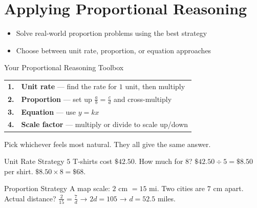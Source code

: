 \section{Applying Proportional Reasoning}

\begin{learningGoals}
\begin{itemize}
    \item Solve real-world proportion problems using the best strategy
    \item Choose between unit rate, proportion, or equation approaches
\end{itemize}
\end{learningGoals}

\begin{conceptBox}{Your Proportional Reasoning Toolbox}
\begin{center}
\begin{tabular}{c l}
    \textbf{1.} & \textbf{Unit rate} --- find the rate for $1$ unit, then multiply \\
    \textbf{2.} & \textbf{Proportion} --- set up $\frac{a}{b} = \frac{c}{d}$ and cross-multiply \\
    \textbf{3.} & \textbf{Equation} --- use $y = kx$ \\
    \textbf{4.} & \textbf{Scale factor} --- multiply or divide to scale up/down \\
\end{tabular}
\end{center}
Pick whichever feels most natural. They all give the same answer.
\end{conceptBox}

\begin{workedExample}{Unit Rate Strategy}
$5$ T-shirts cost $\$42.50$. How much for $8$?
\solutionLabel
$\$42.50 \div 5 = \$8.50$ per shirt. $\$8.50 \times 8 = \$68$.
\end{workedExample}

\begin{workedExample}{Proportion Strategy}
A map scale: $2$ cm $= 15$ mi. Two cities are $7$ cm apart. Actual distance?
\solutionLabel
$\frac{2}{15} = \frac{7}{d}$ → $2d = 105$ → $d = 52.5$ miles.
\end{workedExample}


